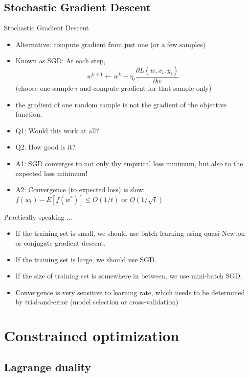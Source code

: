 \documentclass[notes]{beamer}
\begin{document}
\subsection{Stochastic Gradient Descent}
\begin{frame}{Stochastic Gradient Descent}
	\begin{itemize}
		\item Alternative: compute gradient from just one (or a few samples)
		\item Known as SGD: At each step,
		      \[ w^{k+1} \leftarrow w^{k} - \eta_t \frac{\partial L(w,x_i,y_i)}{\partial w}  \]
		      (choose one sample $i$ and compute gradient for that sample only)
		\item the gradient of one random sample is not the gradient of the objective function.
		\item Q1: Would this work at all?
		\item Q2: How good is it?
		\item<2-> A1: SGD converges to not only thy empirical loss minimum, but also to the expected loss minimum!
		\item<2-> A2: Convergence (to expected loss) is slow: $f(w_t) -E[f(w^*)] \le O(1/t) $ or $O(1/\sqrt{t}) $
	\end{itemize}
\end{frame}

\begin{frame}{Practically speaking ... }
	\begin{itemize}
		\item If the training set is small, we should use batch learning using quasi-Newton or conjugate gradient descent.
		\item If the training set is large, we should use SGD.
		\item If the size of training set is somewhere in between, we use mini-batch SGD.
		\item Convergence is very sensitive to learning rate, which needs to be determined by trial-and-error (model selection or cross-validation)
	\end{itemize}
\end{frame}
\section{Constrained optimization}
\subsection{Lagrange duality}
\end{document}
